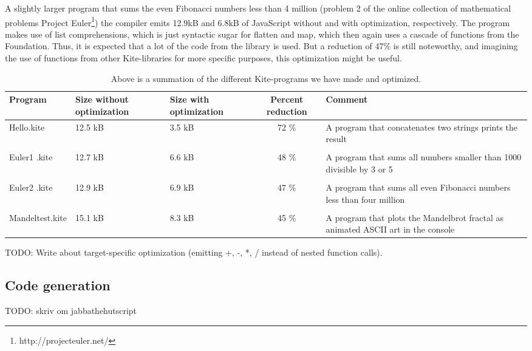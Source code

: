 A slightly larger program that sums the even Fibonacci numbers less than 4 million (problem 2 of the online collection of mathematical problems Project Euler\footnote{http://projecteuler.net/}) the compiler emits 12.9kB and 6.8kB of JavaScript without and with optimization, respectively. The program makes use of list comprehensions, which is just syntactic sugar for flatten and map, which then again uses a cascade of functions from the Foundation. Thus, it is expected that a lot of the code from the library is used. But a reduction of 47\% is still noteworthy, and imagining the use of functions from other Kite-libraries for more specific purposes, this optimization might be useful.


\begin{table}[h]
  \centering
  \begin{tabulary}{0.9\textwidth}{|L| L |L| C | L | }
    \hline
    Program & Size without optimization & Size with optimization & Percent reduction & Comment \\
    \hline
    Hello.kite       & 12.5 kB & 3.5 kB & 72 \% & A program that concatenates two strings prints the result \\
    & & & & \\
    Euler1 .kite       & 12.7 kB & 6.6 kB & 48 \% & A program that sums all numbers smaller than 1000 divisible by 3 or 5 \\
    & & & & \\
    Euler2 .kite       & 12.9 kB & 6.9 kB & 47 \% & A program that sums all even Fibonacci numbers less than four million \\
    & & & & \\
    Mandeltest.kite       & 15.1 kB & 8.3 kB & 45 \% & A program that plots the Mandelbrot fractal as animated ASCII art in the console\\
    \hline
  \end{tabulary}
  \caption{Above is a summation of the different Kite-programs we have made and optimized.}
\end{table}

TODO: Write about target-specific optimization (emitting +, -, *, / instead of nested function calls).


\subsection{Code generation}
TODO: skriv om jabbathehutscript
